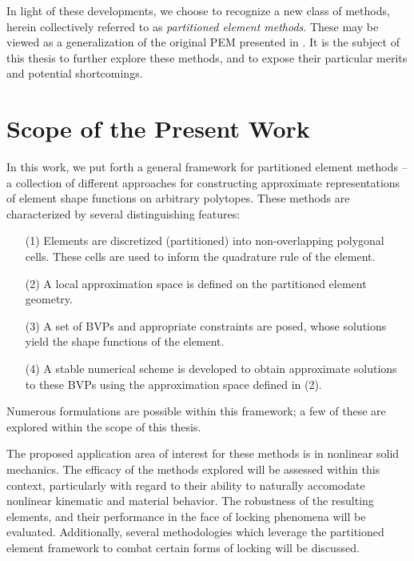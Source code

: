 	In light of these developments, we choose to recognize a new class of methods, herein collectively referred to as \textit{partitioned element methods}. These may be viewed as a generalization of the original PEM presented in \cite{Rashid:12}. It is the subject of this thesis to further explore these methods, and to expose their particular merits and potential shortcomings.

\section{Scope of the Present Work}

	In this work, we put forth a general framework for partitioned element methods -- a collection of different approaches for constructing approximate representations of element shape functions on arbitrary polytopes. These methods are characterized by several distinguishing features:
	\begin{itemize}
		\item[(1)] Elements are discretized (partitioned) into non-overlapping polygonal cells. These cells are used to inform the quadrature rule of the element.
		\item[(2)] A local approximation space is defined on the partitioned element geometry.
		\item[(3)] A set of BVPs and appropriate constraints are posed, whose solutions yield the shape functions of the element.
		\item[(4)] A stable numerical scheme is developed to obtain approximate solutions to these BVPs using the approximation space defined in (2).
	\end{itemize}
	Numerous formulations are possible within this framework; a few of these are explored within the scope of this thesis.
	
	 The proposed application area of interest for these methods is in nonlinear solid mechanics. The efficacy of the methods explored will be assessed within this context, particularly with regard to their ability to naturally accomodate nonlinear kinematic and material behavior. The robustness of the resulting elements, and their performance in the face of locking phenomena will be evaluated. Additionally, several methodologies which leverage the partitioned element framework to combat certain forms of locking will be discussed.

